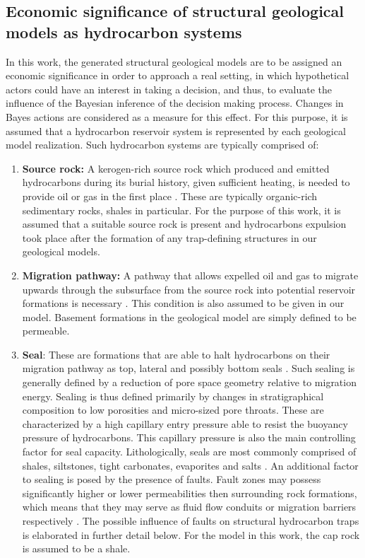         \subsection{Economic significance of structural geological models as hydrocarbon systems}\label{sec:Reservoir_values}
        In this work, the generated structural geological models are to be assigned an economic significance in order to approach a real setting, in which hypothetical actors could have an interest in taking a decision, and thus, to evaluate the influence of the Bayesian inference of the decision making process. Changes in Bayes actions are considered as a measure for this effect. For this purpose, it is assumed that a hydrocarbon reservoir system is represented by each geological model realization.
        Such hydrocarbon systems are typically comprised of:
        \begin{enumerate}
        	\item \textbf{Source rock:} A kerogen-rich source rock which produced and emitted hydrocarbons during its burial history, given sufficient heating, is needed to provide oil or gas in the first place \citep{dolson2016basics}. These are typically organic-rich sedimentary rocks, shales in particular. For the purpose of this work, it is assumed that a  suitable source rock is present and hydrocarbons expulsion took place after the formation of any trap-defining structures in our geological models.
        	\item \textbf{Migration pathway:} A pathway that allows expelled oil and gas to migrate upwards through the subsurface from the source rock into potential reservoir formations is necessary \citep{dolson2016basics}. This condition is also assumed to be given in our model. Basement formations in the geological model are simply defined to be permeable.
        	\item \textbf{Seal}: These are formations that are able to halt hydrocarbons on their migration pathway as top, lateral and possibly bottom seals \citep{dolson2016basics, sorkhabi2005place}. Such sealing is generally defined by a reduction of pore space geometry relative to migration energy. Sealing is thus defined primarily by changes in stratigraphical composition to low porosities and micro-sized pore throats. These are characterized by a high capillary entry pressure able to resist the buoyancy pressure of hydrocarbons. This capillary pressure is also the main controlling factor for seal capacity. Lithologically, seals are most commonly comprised of shales, siltstones, tight carbonates, evaporites and salts \citep{dolson2016basics, dolson2016quantifying, sorkhabi2005place}. An additional factor to sealing is posed by the presence of faults. Fault zones may possess significantly higher or lower permeabilities then surrounding rock formations, which means that they may serve as fluid flow conduits or migration barriers respectively \citep{van2003lateral, sorkhabi2005place}. The possible influence of faults on structural hydrocarbon traps is elaborated in further detail below. For the model in this work, the cap rock is assumed to be a shale.

\end{enumerate}
